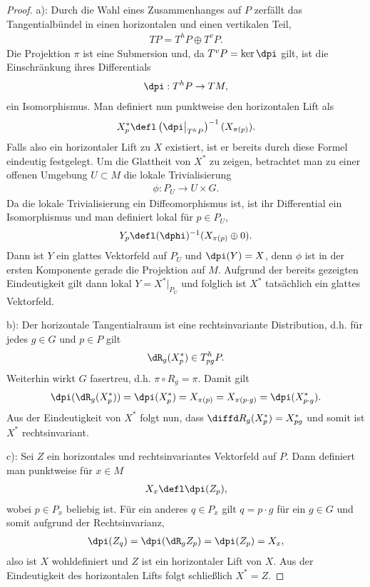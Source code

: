 \documentclass[%
	paper=a5,%
	fleqn,%
	DIV=18,%
	BCOR=0mm,
	fontsize=11pt,
	titlepage=false,%
	bibliography=totoc,
	DIV=18,%
	twoside=true,
	pdftitle=Riemannsche Geometrie,
	pdfauthor=Uwe Semmelmann,
	numbers=noendperiod]%
	{scrbook}
\begin{document}
\begin{proof}
a): Durch die Wahl eines Zusammenhanges auf $P$ zerfällt das Tangentialbündel in
einen horizontalen und einen vertikalen Teil,
\begin{align*}
TP = T^hP \oplus T^vP.
\end{align*}
Die Projektion $\pi$ ist eine Submersion und, da $T^vP = \ker \dpi$ gilt, ist
die Einschränkung ihres Differentials
\begin{align*}
\dpi: T^hP \to TM,
\end{align*}
ein Isomorphismus. Man definiert nun punktweise den horizontalen Lift als
\begin{align*}
X^*_p \defl \left(\dpi\big|_{T^hP}\right)^{-1}(X_{\pi(p)}).
\end{align*}
Falls also ein horizontaler Lift zu $X$ existiert, ist er bereits durch
diese Formel eindeutig festgelegt. Um die Glattheit von $X^*$ zu zeigen,
betrachtet man zu einer offenen Umgebung $U\subset M$ die lokale
Trivialisierung
\begin{align*}
\phi: P_U\to U\times G.
\end{align*}
Da die lokale Trivialisierung ein Diffeomorphismus ist, ist ihr Differential ein
Isomorphismus und man definiert lokal für $p\in P_U$,
\begin{align*}
Y_p \defl (\dphi)^{-1}(X_{\pi(p)}\oplus 0).
\end{align*}
Dann ist $Y$ ein glattes Vektorfeld auf $P_U$ und $\dpi(Y) = X$, denn $\phi$ ist
in der ersten Komponente gerade die Projektion auf $M$. Aufgrund der bereits
gezeigten Eindeutigkeit gilt dann lokal $Y = X^*\big|_{P_U}$ und folglich ist
$X^*$ tatsächlich ein glattes Vektorfeld.

b): Der horizontale Tangentialraum ist eine rechtsinvariante Distribution, d.h.
für jedes $g\in G$ und $p\in P$ gilt
\begin{align*}
\dR_g (X^*_p) \in T_{pg}^h P.
\end{align*}
Weiterhin wirkt $G$ fasertreu, d.h. $\pi\circ R_g = \pi$. Damit gilt
\begin{align*}
\dpi( \dR_g (X_p^*)) = \dpi(X_p^*) = X_{\pi(p)} = X_{\pi(p\cdot g)} = \dpi(X^*_{p\cdot g}).
\end{align*}
Aus der Eindeutigkeit von $X^*$ folgt nun, dass $\diffd R_g(X^*_p) = X_{pg}^*$
und somit ist $X^*$ rechtsinvariant.

c): Sei $Z$ ein horizontales und rechtsinvariantes Vektorfeld auf $P$. Dann
definiert man punktweise für $x\in M$
\begin{align*}
X_x \defl \dpi(Z_p),
\end{align*}
wobei $p\in P_x$ beliebig ist. Für ein anderes $q\in P_x$ gilt $q = p\cdot g$
für ein $g\in G$ und somit aufgrund der Rechtsinvarianz,
\begin{align*}
\dpi(Z_q) = \dpi(\dR_g Z_p) = \dpi(Z_p) = X_x,
\end{align*}
also ist $X$ wohldefiniert und $Z$ ist ein horizontaler Lift von $X$. Aus der Eindeutigkeit des horizontalen Lifts
folgt schließlich $X^* = Z$.


\end{proof}
\end{document}
